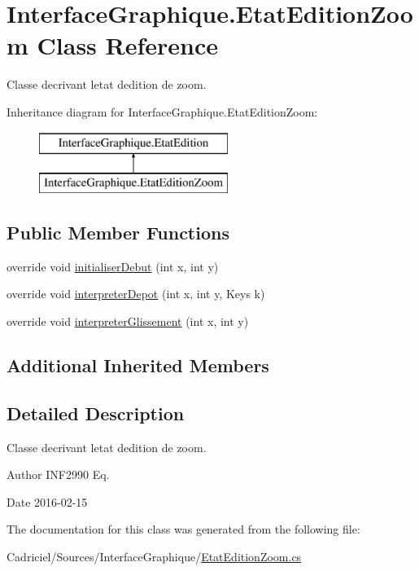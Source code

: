 \hypertarget{class_interface_graphique_1_1_etat_edition_zoom}{}\section{Interface\+Graphique.\+Etat\+Edition\+Zoom Class Reference}
\label{class_interface_graphique_1_1_etat_edition_zoom}


Classe decrivant l\textquotesingle{}etat d\textquotesingle{}edition de zoom.  


Inheritance diagram for Interface\+Graphique.\+Etat\+Edition\+Zoom\+:\begin{figure}[H]
\begin{center}
\leavevmode
\includegraphics[height=2.000000cm]{class_interface_graphique_1_1_etat_edition_zoom}
\end{center}
\end{figure}
\subsection*{Public Member Functions}
\begin{DoxyCompactItemize}
\item 
override void \hyperlink{group__inf2990_ga8d80941bca37245c8f76f6db5d6350fc}{initialiser\+Debut} (int x, int y)
\item 
override void \hyperlink{group__inf2990_ga69f84cb3df5357cba3fc880ba8a61147}{interpreter\+Depot} (int x, int y, Keys k)
\item 
override void \hyperlink{group__inf2990_ga3409e2e6b503aea9e520673c46ef92e7}{interpreter\+Glissement} (int x, int y)
\end{DoxyCompactItemize}
\subsection*{Additional Inherited Members}


\subsection{Detailed Description}
Classe decrivant l\textquotesingle{}etat d\textquotesingle{}edition de zoom. 

\begin{DoxyAuthor}{Author}
I\+N\+F2990 Eq. 
\end{DoxyAuthor}
\begin{DoxyDate}{Date}
2016-\/02-\/15 
\end{DoxyDate}


The documentation for this class was generated from the following file\+:\begin{DoxyCompactItemize}
\item 
Cadriciel/\+Sources/\+Interface\+Graphique/\hyperlink{_etat_edition_zoom_8cs}{Etat\+Edition\+Zoom.\+cs}\end{DoxyCompactItemize}
